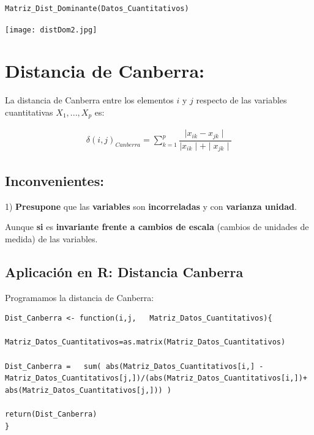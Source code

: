 \documentclass[12pt]{report} %
\begin{document}
\newpage

\begin{lstlisting}
Matriz_Dist_Dominante(Datos_Cuantitativos)
\end{lstlisting}


\texttt{[image: distDom2.jpg]}

\newpage



\section{Distancia de Canberra:}


\begin{tcolorbox}[toptitle=2mm,title= Distancia Canberra:   ]
La distancia de Canberra entre los elementos $i$ y $j$ respecto de las variables cuantitativas $X_1,...,X_p$ es:

\begin{gather*}
 \delta(i,j)_{Canberra}= \sum_{k=1}^{p} \dfrac{\mid x_{ik} - x_{jk} \mid}{\mid x_{ik} \mid + \mid x_{jk} \mid}  
 \end{gather*}

\end{tcolorbox}


\subsection{Inconvenientes:}


1) \hspace{0.15cm} \textbf{Presupone} que las \textbf{variables} son \textbf{incorreladas} y con \textbf{varianza unidad}. 

Aunque \textbf{si} es \textbf{invariante frente a cambios de escala} (cambios de unidades de medida) de las variables.


\newpage
 
\subsection{Aplicación en R: Distancia Canberra}

Programamos la  distancia  de Canberra:

\begin{lstlisting}
Dist_Canberra <- function(i,j,   Matriz_Datos_Cuantitativos){

Matriz_Datos_Cuantitativos=as.matrix(Matriz_Datos_Cuantitativos)  

Dist_Canberra =   sum( abs(Matriz_Datos_Cuantitativos[i,] - Matriz_Datos_Cuantitativos[j,])/(abs(Matriz_Datos_Cuantitativos[i,])+ abs(Matriz_Datos_Cuantitativos[j,])) ) 
  
return(Dist_Canberra)
}

\end{lstlisting}
\end{document}
